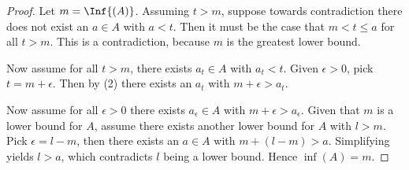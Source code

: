 \documentclass[10pt,twoside,openany]{memoir}
\begin{document}
        \begin{proof}
            Let $m = \Inf{(A)}$. Assuming $t > m$, suppose towards contradiction there does not exist an $a \in A$ with $a < t$. Then it must be the case that $m < t \leq a$ for all $t > m$. This is a contradiction, because $m$ is the greatest lower bound.

            Now assume for all $t > m$, there exists $a_t \in A$ with $a_t < t$. Given $\epsilon > 0$, pick $t = m + \epsilon$. Then by (2) there exists an $a_t$ with $m+ \epsilon > a_t$.

            Now assume for all $\epsilon >0$ there exists $a_\epsilon \in A$ with $m + \epsilon > a_\epsilon$. Given that $m$ is a lower bound for $A$, assume there exists another lower bound for $A$ with $l > m$. Pick $\epsilon = l - m$, then there exists an $a \in A$ with $m + (l - m) > a$. Simplifying yields $l > a$, which contradicts $l$ being a lower bound. Hence $\inf{(A)} = m$.
        \end{proof}
\end{document}

